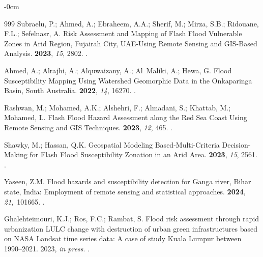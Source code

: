 \documentclass[water,article,accept,pdftex,oneauhor]{Definitions/mdpi}
\begin{document}
{{{\begin{adjustwidth}{-\extralength}{0cm}
\begin{thebibliography}{999}
Subraelu, P.; Ahmed, A.; Ebraheem, A.A.; Sherif, M.; Mirza, S.B.; Ridouane,
  F.L.; Sefelnasr, A.
\newblock Risk Assessment and Mapping of Flash Flood Vulnerable Zones in Arid
  Region, Fujairah City, UAE-Using Remote Sensing and GIS-Based Analysis.
 {\bf 2023}, {\em 15}, 2802.
.

Ahmed, A.; Alrajhi, A.; Alquwaizany, A.; Al~Maliki, A.; Hewa, G.
\newblock Flood Susceptibility Mapping Using Watershed Geomorphic Data in the
  Onkaparinga Basin, South Australia.
 {\bf 2022}, {\em 14}, 16270.
.

Rashwan, M.; Mohamed, A.K.; Alshehri, F.; Almadani, S.; Khattab, M.; Mohamed,
  L.
\newblock Flash Flood Hazard Assessment along the Red Sea Coast Using Remote
  Sensing and GIS Techniques.
 {\bf 2023}, {\em 12}, 465.
.

Shawky, M.; Hassan, Q.K.
\newblock Geospatial Modeling Based-Multi-Criteria Decision-Making for Flash
  Flood Susceptibility Zonation in an Arid Area.
 {\bf 2023}, {\em 15}, 2561.
.

Yaseen, Z.M.
\newblock Flood hazards and susceptibility detection for Ganga river, Bihar
  state, India: Employment of remote sensing and statistical approaches.
 {\bf 2024}, {\em 21},~101665.
.

Ghalehteimouri, K.J.; Ros, F.C.; Rambat, S.
\newblock Flood risk assessment through rapid urbanization LULC change with
  destruction of urban green infrastructures based on NASA Landsat time series
  data: A case of study Kuala Lumpur between 1990--2021.
 { 2023}, \emph{in press}.
.


\end{thebibliography}
\end{adjustwidth}}}}
\end{document}
